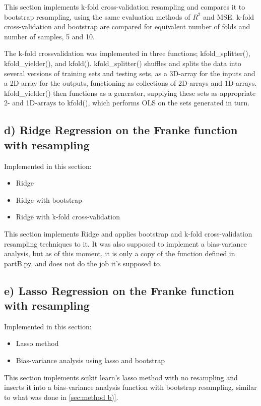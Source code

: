 \documentclass[a4paper, UKenglish]{article}
\newcommand{\0}{\mathbf{0}}
\newcommand{\1}{\mathbf{1}}
\begin{document}
This section implements k-fold cross-validation resampling and compares it to bootstrap resampling, using the same evaluation methods of $R^2$ and MSE. k-fold cross-validation and bootstrap are compared for equivalent number of folds and number of samples, 5 and 10.

The k-fold crossvalidation was implemented in three functions; kfold\_splitter(), kfold\_yielder(), and kfold(). kfold\_splitter() shuffles and splits the data into several versions of training sets and testing sets, as a 3D-array for the inputs and a 2D-array for the outputs, functioning as collections of 2D-arrays and 1D-arrays. kfold\_yielder() then functions as a generator, supplying these sets as appropriate 2- and 1D-arrays to kfold(), which performs OLS on the sets generated in turn.

\subsection{d) Ridge Regression on the Franke function with resampling}
Implemented in this section: 
\begin{itemize}
\item Ridge
\item Ridge with bootstrap
\item Ridge with k-fold cross-validation
\end{itemize}

This section implements Ridge and applies bootstrap and k-fold cross-validation resampling techniques to it. It was also supposed to implement a bias-variance analysis, but as of this moment, it is only a copy of the function defined in partB.py, and does not do the job it's supposed to.

\subsection{e) Lasso Regression on the Franke function with resampling}
Implemented in this section: 
\begin{itemize}
\item Lasso method
\item Bias-variance analysis using lasso and bootstrap
\end{itemize}


This section implements scikit learn's lasso method with no resampling and inserts it into a bias-variance analysis function with bootstrap resampling, similar to what was done in \autoref{sec:method b)}.
\end{document}
